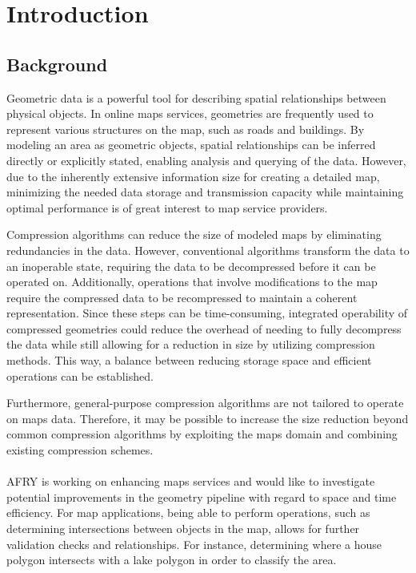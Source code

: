 \chapter[Introduction]{Introduction}
\section{Background}


Geometric data is a powerful tool for describing spatial relationships between physical objects. In online maps services, geometries are frequently used to represent various structures on the map, such as roads and buildings. By modeling an area as geometric objects, spatial relationships can be inferred directly or explicitly stated, enabling analysis and querying of the data. However, due to the inherently extensive information size for creating a detailed map, minimizing the needed data storage and transmission capacity while maintaining optimal performance is of great interest to map service providers.

Compression algorithms can reduce the size of modeled maps by eliminating redundancies in the data. However, conventional algorithms transform the data to an inoperable state, requiring the data to be decompressed before it can be operated on. Additionally, operations that involve modifications to the map require the compressed data to be recompressed to maintain a coherent representation. Since these steps can be time-consuming, integrated operability of compressed geometries could reduce the overhead of needing to fully decompress the data while still allowing for a reduction in size by utilizing compression methods. This way, a balance between reducing storage space and efficient operations can be established.

Furthermore, general-purpose compression algorithms are not tailored to operate on maps data. Therefore, it may be possible to increase the size reduction beyond common compression algorithms by exploiting the maps domain and combining existing compression schemes.
\\\\
AFRY is working on enhancing maps services and would like to investigate potential improvements in the geometry pipeline with regard to space and time efficiency. For map applications, being able to perform operations, such as determining intersections between objects in the map, allows for further validation checks and relationships. For instance, determining where a house polygon intersects with a lake polygon in order to classify the area.

